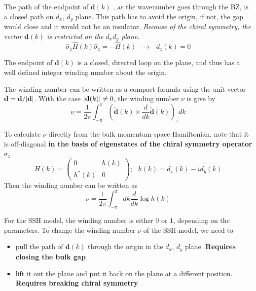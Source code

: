 The path of the endpoint of $\mathbf{d}(k)$ , as the wavenumber goes through the BZ, is a closed path on $d_x$, $d_y$ plane.
This path has to avoid the origin, if not, the gap would close and it would not be an insulator.
\textit{Because of the chiral symmetry, the vector $\mathbf{d}(k)$ is restricted on the $d_xd_y$ plane.}
\begin{equation}
    \hat{\sigma}_z \hat{H}(k) \hat{\sigma}_z = - \hat{H}(k) ~ ~ ~ \to ~ ~ ~ d_z(k) = 0 \label{eq:1.36}
\end{equation}

The endpoint of $\mathbf{d}(k)$ is a closed, directed loop on the plane, and thus has a well defined integer winding number about the origin.


The winding number can be written as a compact formula using the unit vector $\tilde{\mathbf{d}} = \mathbf{d}/\abs{\mathbf{d}}$.
With the case $\abs{\mathbf{d}(k)} \neq 0$, the winding number $\nu$ is give by
\begin{equation}
    \nu = \frac{1}{2\pi} \int_{-\pi}^{\pi} \left( \tilde{\mathbf{d}}(k) \times \frac{d}{dk} \tilde{\mathbf{d}}(k) \right)_z dk
    \label{eq:1.38}
\end{equation}

To calculate $\nu$ directly from the bulk momentum-space Hamiltonian, note that it is off-diagonal \textbf{in the basis of eigenstates of the chiral symmetry operator $\sigma_z$}
\begin{equation}
    H(k) =
    \begin{pmatrix}
        0 & h(k) \\
        h^*(k) & 0
    \end{pmatrix};
    ~ ~ ~ h(k) = d_x(k) - id_y(k) \label{eq:1.39}
\end{equation}
Then the winding number can be written as
\begin{equation}
    \nu = \frac{1}{2\pi} \int_{-\pi}^{\pi} dk \frac{d}{dk} \log h(k)    \label{eq:1.40}
\end{equation}


For the SSH model, the winding number is either $0$ or $1$, depending on the parameters.
To change the winding number $\nu$ of the SSH model, we need to
\begin{itemize}
    \item pull the path of $\mathbf{d}(k)$ through the origin in the $d_x$, $d_y$ plane. \textbf{Requires closing the bulk gap}
    \item lift it out the plane and put it back on the plane at a different position. \textbf{Requires breaking chiral symmetry}
\end{itemize}

